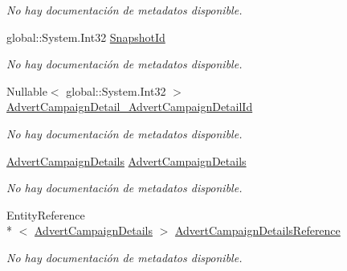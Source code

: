 \begin{DoxyCompactItemize}
\begin{DoxyCompactList}\small\item\em No hay documentación de metadatos disponible. \end{DoxyCompactList}\item 
global\-::\-System.\-Int32 \hyperlink{class_microsoft_1_1_samples_1_1_kinect_1_1_basic_interactions_1_1_interactions_a0251c4eb23004e2ee51e6c839e06ca5a}{Snapshot\-Id}
\begin{DoxyCompactList}\small\item\em No hay documentación de metadatos disponible. \end{DoxyCompactList}\item 
Nullable$<$ global\-::\-System.\-Int32 $>$ \hyperlink{class_microsoft_1_1_samples_1_1_kinect_1_1_basic_interactions_1_1_interactions_aec28ed0210ec2ca502f8e1cec085b164}{Advert\-Campaign\-Detail\-\_\-\-Advert\-Campaign\-Detail\-Id}
\begin{DoxyCompactList}\small\item\em No hay documentación de metadatos disponible. \end{DoxyCompactList}\item 
\hyperlink{class_microsoft_1_1_samples_1_1_kinect_1_1_basic_interactions_1_1_advert_campaign_details}{Advert\-Campaign\-Details} \hyperlink{class_microsoft_1_1_samples_1_1_kinect_1_1_basic_interactions_1_1_interactions_a2ea412f8365b9df0598899012be7b6de}{Advert\-Campaign\-Details}
\begin{DoxyCompactList}\small\item\em No hay documentación de metadatos disponible. \end{DoxyCompactList}\item 
Entity\-Reference\\*
$<$ \hyperlink{class_microsoft_1_1_samples_1_1_kinect_1_1_basic_interactions_1_1_advert_campaign_details}{Advert\-Campaign\-Details} $>$ \hyperlink{class_microsoft_1_1_samples_1_1_kinect_1_1_basic_interactions_1_1_interactions_af3311a9cd64d2724cfde117072ea9be0}{Advert\-Campaign\-Details\-Reference}
\begin{DoxyCompactList}\small\item\em No hay documentación de metadatos disponible. \end{DoxyCompactList}\item 

\end{DoxyCompactItemize}
